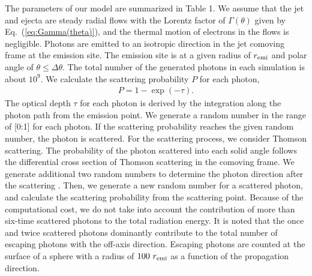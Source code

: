 \documentclass{emulateapj}
\begin{document}
The parameters of our model are summarized in Table 1. 
We assume that the jet and ejecta are steady radial flows 
with the Lorentz factor of $\Gamma(\theta)$ given by Eq.~(\ref{eq:Gamma(theta)}), 
and the thermal motion of electrons in the flows is negligible. 
Photons are emitted to an isotropic direction in the jet comoving frame at the emission site.  
The emission site is at a given radius of $r_{\rm emi}$ and polar angle of $\theta\le\Delta\theta$. 
The total number of the generated photons in each simulation is about $10^9$. 
We calculate the scattering probability $P$ for each photon, 
\begin{eqnarray}
P=1-\exp(-\tau).
\end{eqnarray}
The optical depth $\tau$ for each photon is derived by the integration along the photon path
from the emission point. 
We generate a random number in the range of [0:1] for each photon.
If the scattering probability reaches the given random number, the photon is scattered. 
For the scattering process, we consider Thomson scattering. 
The probability of the photon scattered into each solid angle follows 
the differential cross section of Thomson scattering \citep[e.g., ][]{1979rpa..book.....R} 
in the comoving frame. 
We generate additional two random numbers to determine the photon direction after the scattering \citep{1983ASPRv...2..189P}.
Then, we generate a new random number for a scattered photon, and calculate the scattering probability
from the scattering point.
Because of the computational cost, we do not take into account the contribution of more than six-time scattered photons
to the total radiation energy.
It is noted that the once and twice scattered photons dominantly contribute to the total number of escaping photons
with the off-axis direction.
Escaping photons are counted at the surface of a sphere with a radius of $100~r_{\rm emi}$
as a function of the propagation direction. 
\end{document}
